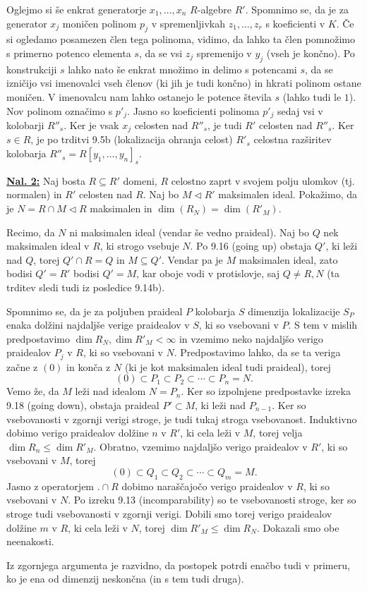 \documentclass[a4paper, 12pt]{article}
\newcommand{\subideal}{\vartriangleleft}
\begin{document}
Oglejmo si še enkrat generatorje $x_1,\dots,x_n$ $R$-algebre $R'$. Spomnimo se, da je za generator $x_j$ moničen polinom $p_j$ v spremenljivkah $z_1,\dots,z_r$ s koeficienti v $K$. Če si ogledamo posamezen člen tega polinoma, vidimo, da lahko ta člen pomnožimo s primerno potenco elementa $s$, da se vsi $z_j$ spremenijo v $y_j$ (vseh je končno). Po konstrukciji $s$ lahko nato še enkrat množimo in delimo s potencami $s$, da se izničijo vsi imenovalci vseh členov (ki jih je tudi končno) in hkrati polinom ostane moničen. V imenovalcu nam lahko ostanejo le potence števila $s$ (lahko tudi le $1$). Nov polinom označimo s $p'_j$. Jasno so koeficienti polinoma $p'_j$ sedaj vsi v kolobarji $R''_s$. Ker je vsak $x_j$ celosten nad $R''_s$, je tudi $R'$ celosten nad $R''_s$. Ker $s \in R$, je po trditvi 9.5b (lokalizacija ohranja celost) $R'_s$ celostna razširitev kolobarja $R''_s = R[y_1,\dots,y_n]_s$.
\newline

\underline{\textbf{Nal. 2:}}
Naj bosta $R \subseteq R'$ domeni, $R$ celostno zaprt v svojem polju ulomkov (tj. normalen) in $R'$ celosten nad $R$. Naj bo $M \subideal R'$ maksimalen ideal. Pokažimo, da je $N = R \cap M \subideal R$ maksimalen in $\dim(R_N) = \dim(R'_M)$.

Recimo, da $N$ ni maksimalen ideal (vendar še vedno praideal). Naj bo $Q$ nek maksimalen ideal v $R$, ki strogo vsebuje $N$. Po 9.16 (going up) obstaja $Q'$, ki leži nad $Q$, torej $Q' \cap R = Q$ in $M \subseteq Q'$. Vendar pa je $M$ maksimalen ideal, zato bodisi $Q' = R'$ bodisi $Q' = M$, kar oboje vodi v protislovje, saj $Q \neq R, N$ (ta trditev sledi tudi iz posledice 9.14b).

Spomnimo se, da je za poljuben praideal $P$ kolobarja $S$ dimenzija lokalizacije $S_P$ enaka dolžini najdaljše verige praidealov v $S$, ki so vsebovani v $P$. S tem v mislih predpostavimo $\dim R_N, \dim R'_M < \infty$ in vzemimo neko najdaljšo verigo praidealov $P_j$ v $R$, ki so vsebovani v $N$. Predpostavimo lahko, da se ta veriga začne z $(0)$ in konča z $N$ (ki je kot maksimalen ideal tudi praideal), torej
\[
(0) \subset P_1 \subset P_2 \subset \cdots \subset P_n = N.
\]
Vemo že, da $M$ leži nad idealom $N = P_n$. Ker so izpolnjene predpostavke izreka 9.18 (going down), obstaja praideal $P' \subset M$, ki leži nad $P_{n-1}$. Ker so vsebovanosti v zgornji verigi stroge, je tudi tukaj stroga vsebovanost. Induktivno dobimo verigo praidealov dolžine $n$ v $R'$, ki cela leži v $M$, torej velja $\dim R_n \leq \dim R'_M$.
Obratno, vzemimo najdaljšo verigo praidealov v $R'$, ki so vsebovani v $M$, torej
\[
(0) \subset Q_1 \subset Q_2 \subset \cdots \subset Q_m = M.
\]
Jasno z operatorjem $. \cap R$ dobimo naraščajočo verigo praidealov v $R$, ki so vsebovani v $N$. Po izreku 9.13 (incomparability) so te vsebovanosti stroge, ker so stroge tudi vsebovanosti v zgornji verigi. Dobili smo torej verigo praidealov dolžine $m$ v $R$, ki cela leži v $N$, torej $\dim R'_M \leq \dim R_N$. Dokazali smo obe neenakosti.

Iz zgornjega argumenta je razvidno, da postopek potrdi enačbo tudi v primeru, ko je ena od dimenzij neskončna (in s tem tudi druga).
\end{document}
